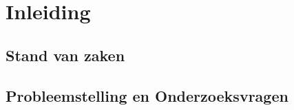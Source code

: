 
\chapter{Inleiding}
\label{ch:inleiding}




\section{Stand van zaken}
\label{sec:stand-van-zaken}


\section{Probleemstelling en Onderzoeksvragen}
\label{sec:onderzoeksvragen}


